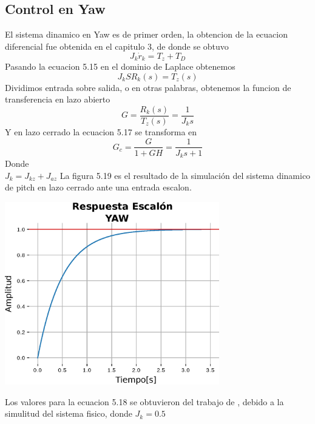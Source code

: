 \subsection{Control en Yaw}
El sistema dinamico en Yaw es de primer orden, la obtencion de la ecuacion diferencial 
fue obtenida en el capitulo 3, de donde se obtuvo
\begin{equation}
	J_k\dot{r}_k = T_z+T_D
\end{equation}
Pasando la ecuacion 5.15 en el dominio de Laplace obtenemos
\begin{equation}
	J_{k}SR_k(s) = T_z(s)
\end{equation}
Dividimos entrada sobre salida, o en otras palabras, obtenemos la funcion de transferencia en lazo abierto
\begin{equation}
	G = \frac{R_k(s)}{T_z(s)} =  \frac{1}{J_{k}s}
\end{equation}
Y en lazo cerrado la ecuacion 5.17 se transforma en 
\begin{equation}
	G_c = \frac{G}{1 +GH} = \frac{1}{J_{k}s+1}
\end{equation}
Donde \\
$J_k = J_{kz} + J_{az} $ 
La figura 5.19 es el resultado de la simulación del sistema dinamico de pitch en lazo cerrado ante una entrada escalon.
\begin{center}
	\includegraphics[width=0.7\textwidth]{Contenido/Cuerpo/Capitulo5/Fig29.eps}
	\label{Fig4}
\end{center}
Los valores para la ecuacion 5.18 se obtuvieron del trabajo de \cite{Paper::Abdo2013}, debido a la simulitud del sistema fisico, donde 
$J_{k} = 0.5$ 